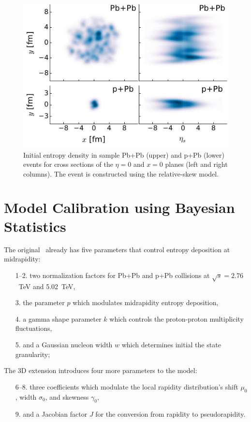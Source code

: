 \documentclass[3p,times,twocolumn]{elsarticle}
\begin{document}
\begin{figure}
\includegraphics[width=\columnwidth]{trento3d_example.pdf}
\caption{\label{fig:trento} Initial entropy density in sample Pb+Pb (upper) and p+Pb (lower) events for cross sections of the $\eta=0$ and $x=0$ planes (left and right columns). The event is constructed using the relative-skew model.}
\end{figure}

\section{Model Calibration using Bayesian Statistics}
The original \trento~already has five parameters that control entropy deposition at midrapidity:
\begin{enumerate}
  \item[1--2.] two normalization factors for Pb+Pb and p+Pb collisions at $\sqrt{s}=2.76$~TeV and 5.02~TeV,
  \item[3.] the parameter $p$ which modulates midrapidity entropy deposition,
  \item[4.] a gamma shape parameter $k$ which controls the proton-proton multiplicity fluctuations,
  \item[5.] and a Gaussian nucleon width $w$ which determines initial the state granularity;
\end{enumerate}
The 3D extension introduces four more parameters to the model:
\begin{enumerate}
  \setcounter{enumi}{6}
  \item[6--8.] three coefficients which modulate the local rapidity distribution's shift $\mu_0$, width $\sigma_0$, and skewness $\gamma_0$,
  \item[9.] and a Jacobian factor $J$ for the conversion from rapidity to pseudorapidity.
\end{enumerate}
\end{document}
